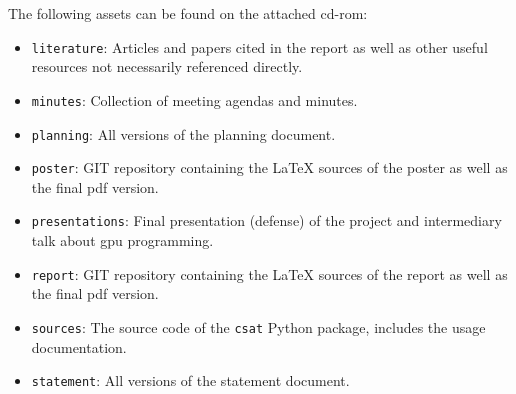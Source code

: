 
The following assets can be found on the attached \gls{cd-rom}:

\begin{itemize}
  \item \texttt{literature}: Articles and papers cited in the report as well as other useful resources not necessarily referenced directly.
  \item \texttt{minutes}: Collection of meeting agendas and minutes.
  \item \texttt{planning}: All versions of the planning document.
  \item \texttt{poster}: GIT repository containing the \LaTeX{} sources of the poster as well as the final \gls{pdf} version.
  \item \texttt{presentations}: Final presentation (defense) of the project and intermediary talk about \gls{gpu} programming.
  \item \texttt{report}: GIT repository containing the \LaTeX{} sources of the report as well as the final \gls{pdf} version.
  \item \texttt{sources}: The source code of the \texttt{csat} Python package, includes the usage documentation.
  \item \texttt{statement}: All versions of the statement document.
\end{itemize}

